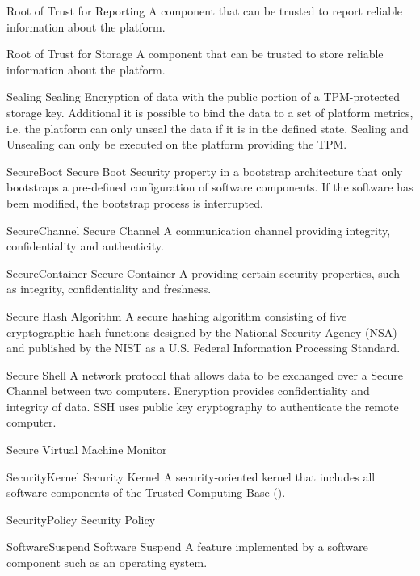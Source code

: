     {Root of Trust for Reporting}
    {A component that can be trusted to report reliable information about the
platform.}

    {Root of Trust for Storage}
    {A component that can be trusted to store reliable information about the
platform.}

\glosentry
    {Sealing}
    {Sealing}
    {Encryption of data with the public portion of a TPM-protected storage key. 
Additional it is possible to bind the data to a set of platform metrics, i.e.
the platform can only unseal the data if it is in the defined state.
Sealing and Unsealing can only be executed on the platform providing the TPM.}

\glosentry
    {SecureBoot}
    {Secure Boot}
    {Security property in a bootstrap architecture that only bootstraps a
pre-defined configuration of software components. If the software has been
modified, the bootstrap process is interrupted.}

\glosentry
    {SecureChannel}
    {Secure Channel}
    {A communication channel providing integrity, confidentiality and
authenticity.}

\glosentry
    {SecureContainer}
    {Secure Container}
    {A \Container providing certain security properties, such as integrity,
confidentiality and freshness.}

    {Secure Hash Algorithm}
    {A secure hashing algorithm consisting of five cryptographic hash functions
designed by the National Security Agency (NSA) and published by the NIST as a
U.S. Federal Information Processing Standard.}

    {Secure Shell}
    {A network protocol that allows data to be exchanged over a Secure Channel
between two computers. Encryption provides confidentiality and integrity of
data. SSH uses public key cryptography to authenticate the remote computer.}

    {Secure Virtual Machine Monitor}

\glosentry
    {SecurityKernel}
    {Security Kernel}
    {A security-oriented kernel that includes all software components of the
Trusted Computing Base (\TCB).}

\glosentry
    {SecurityPolicy}
    {Security Policy}
    {}

\glosentry
    {SoftwareSuspend}
    {Software Suspend}
    {A \Hibernation feature implemented by a software component such as an operating system.}

